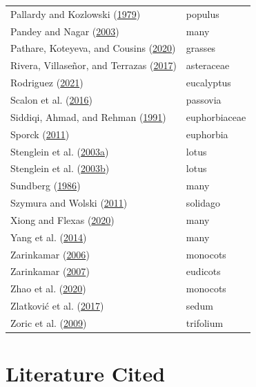 \documentclass[
  12pt,
]{article}
\begin{document}
\begin{longtable}[]{@{}ll@{}}
Pallardy and Kozlowski (\protect\hyperlink{ref-pallardy_frequency_1979}{1979}) & populus \\
Pandey and Nagar (\protect\hyperlink{ref-pandey_patterns_2003}{2003}) & many \\
Pathare, Koteyeva, and Cousins (\protect\hyperlink{ref-pathare_increased_2020}{2020}) & grasses \\
Rivera, Villaseñor, and Terrazas (\protect\hyperlink{ref-rivera_meso-_2017}{2017}) & asteraceae \\
Rodriguez (\protect\hyperlink{ref-rodriguez_unpublished_2021}{2021}) & eucalyptus \\
Scalon et al. (\protect\hyperlink{ref-scalon_leaf_2016}{2016}) & passovia \\
Siddiqi, Ahmad, and Rehman (\protect\hyperlink{ref-siddiqi_contribution_1991}{1991}) & euphorbiaceae \\
Sporck (\protect\hyperlink{ref-sporck_hawaiian_2011}{2011}) & euphorbia \\
Stenglein et al. (\protect\hyperlink{ref-stenglein_leaf_2003}{2003a}) & lotus \\
Stenglein et al. (\protect\hyperlink{ref-stenglein_leaf_2003-1}{2003b}) & lotus \\
Sundberg (\protect\hyperlink{ref-sundberg_comparison_1986}{1986}) & many \\
Szymura and Wolski (\protect\hyperlink{ref-szymura_leaf_2011}{2011}) & solidago \\
Xiong and Flexas (\protect\hyperlink{ref-xiong_one_2020}{2020}) & many \\
Yang et al. (\protect\hyperlink{ref-yang_large-scale_2014}{2014}) & many \\
Zarinkamar (\protect\hyperlink{ref-zarinkamar_density_2006}{2006}) & monocots \\
Zarinkamar (\protect\hyperlink{ref-zarinkamar_stomatal_2007}{2007}) & eudicots \\
Zhao et al. (\protect\hyperlink{ref-zhao_difference_2020}{2020}) & monocots \\
Zlatković et al. (\protect\hyperlink{ref-zlatkovic_epidermal_2017}{2017}) & sedum \\
Zoric et al. (\protect\hyperlink{ref-zoric_leaf_2009}{2009}) & trifolium \\
\bottomrule
\end{longtable}

\clearpage

\hypertarget{literature-cited}{%
\section*{Literature Cited}\label{literature-cited}}
\end{document}
